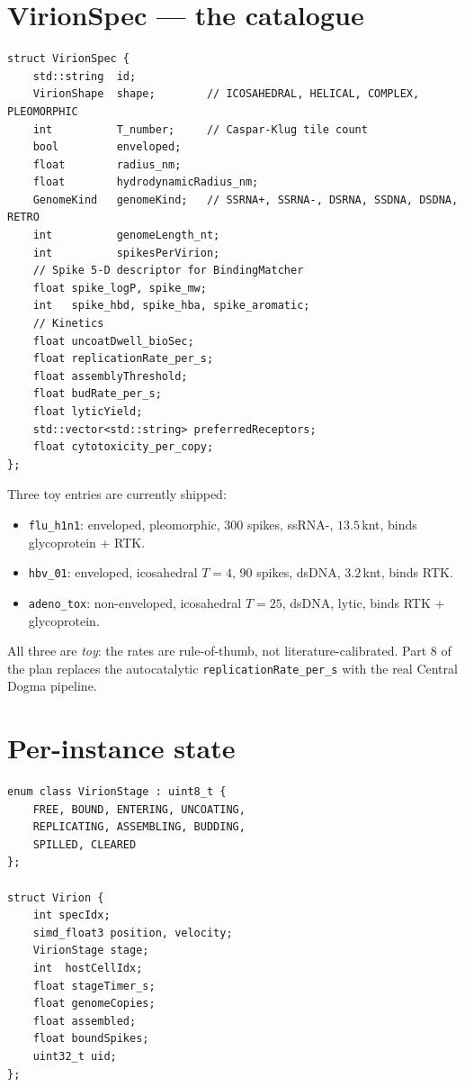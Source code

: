 \documentclass[11pt,letterpaper,twoside,openany]{book}
\newcommand{\code}[1]{\texttt{#1}}
\begin{document}
\section{VirionSpec --- the catalogue}

\begin{lstlisting}
struct VirionSpec {
    std::string  id;
    VirionShape  shape;        // ICOSAHEDRAL, HELICAL, COMPLEX, PLEOMORPHIC
    int          T_number;     // Caspar-Klug tile count
    bool         enveloped;
    float        radius_nm;
    float        hydrodynamicRadius_nm;
    GenomeKind   genomeKind;   // SSRNA+, SSRNA-, DSRNA, SSDNA, DSDNA, RETRO
    int          genomeLength_nt;
    int          spikesPerVirion;
    // Spike 5-D descriptor for BindingMatcher
    float spike_logP, spike_mw;
    int   spike_hbd, spike_hba, spike_aromatic;
    // Kinetics
    float uncoatDwell_bioSec;
    float replicationRate_per_s;
    float assemblyThreshold;
    float budRate_per_s;
    float lyticYield;
    std::vector<std::string> preferredReceptors;
    float cytotoxicity_per_copy;
};
\end{lstlisting}

Three toy entries are currently shipped:
\begin{itemize}
  \item \texttt{flu\_h1n1}: enveloped, pleomorphic, 300 spikes,
    ssRNA-, $13.5$\,knt, binds glycoprotein + RTK.
  \item \texttt{hbv\_01}: enveloped, icosahedral $T{=}4$, 90 spikes,
    dsDNA, $3.2$\,knt, binds RTK.
  \item \texttt{adeno\_tox}: non-enveloped, icosahedral $T{=}25$,
    dsDNA, lytic, binds RTK + glycoprotein.
\end{itemize}

All three are \emph{toy}: the rates are rule-of-thumb, not
literature-calibrated. Part 8 of the plan replaces the
autocatalytic \code{replicationRate\_per\_s} with the real
Central Dogma pipeline.

\section{Per-instance state}

\begin{lstlisting}
enum class VirionStage : uint8_t {
    FREE, BOUND, ENTERING, UNCOATING,
    REPLICATING, ASSEMBLING, BUDDING,
    SPILLED, CLEARED
};

struct Virion {
    int specIdx;
    simd_float3 position, velocity;
    VirionStage stage;
    int  hostCellIdx;
    float stageTimer_s;
    float genomeCopies;
    float assembled;
    float boundSpikes;
    uint32_t uid;
};
\end{lstlisting}
\end{document}
